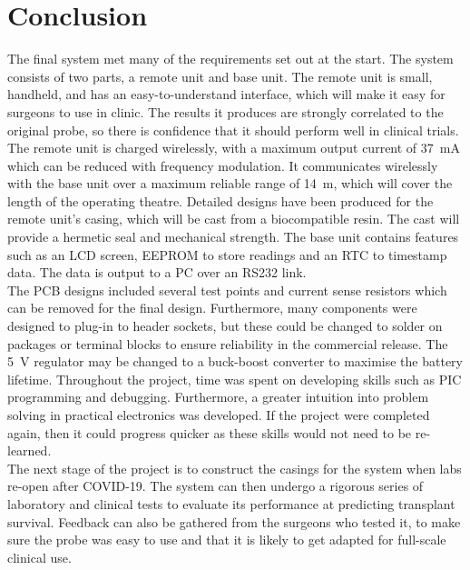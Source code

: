 \section{Conclusion}
The final system met many of the requirements set out at the start. The system consists of two parts, a remote unit and base unit. The remote unit is small, handheld, and has an easy-to-understand interface, which will make it easy for surgeons to use in clinic. The results it produces are strongly correlated to the original probe, so there is confidence that it should perform well in clinical trials. The remote unit is charged wirelessly, with a maximum output current of \SI{37}{\milli\ampere} which can be reduced with frequency modulation. It communicates wirelessly with the base unit over a maximum reliable range of \SI{14}{\metre}, which will cover the length of the operating theatre. Detailed designs have been produced for the remote unit's casing, which will be cast from a biocompatible resin. The cast will provide a hermetic seal and mechanical strength. The base unit contains features such as an LCD screen, EEPROM to store readings and an RTC to timestamp data. The data is output to a PC over an RS232 link.\\

The PCB designs included several test points and current sense resistors which can be removed for the final design. Furthermore, many components were designed to plug-in to header sockets, but these could be changed to solder on packages or terminal blocks to ensure reliability in the commercial release. The \SI{5}{\volt} regulator may be changed to a buck-boost converter to maximise the battery lifetime. Throughout the project, time was spent on developing skills such as PIC programming and debugging. Furthermore, a greater intuition into problem solving in practical electronics was developed. If the project were completed again, then it could progress quicker as these skills would not need to be re-learned. \\

The next stage of the project is to construct the casings for the system when labs re-open after COVID-19. The system can then undergo a rigorous series of laboratory and clinical tests to evaluate its performance at predicting transplant survival. Feedback can also be gathered from the surgeons who tested it, to make sure the probe was easy to use and that it is likely to get adapted for full-scale clinical use.\\